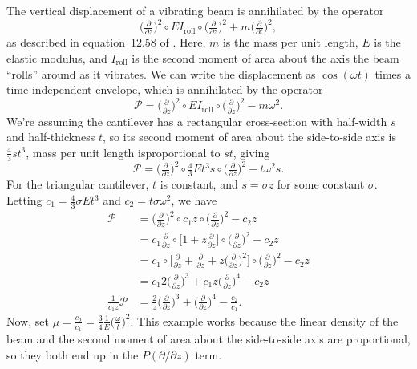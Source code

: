 \documentclass{article}
\theoremstyle{definition}
\theoremstyle{plain}
\newenvironment{verify}{\color{ForestGreen}}{\color{black}}
\begin{document}
\begin{verify}
The vertical displacement of a vibrating beam is annihilated by the operator
\[ \big(\tfrac{\partial}{\partial z}\big)^2 \circ EI_\text{roll} \circ \big(\tfrac{\partial}{\partial z}\big)^2 + m \big(\tfrac{\partial}{\partial t}\big)^2, \]
as described in equation~12.58 of \cite{genta2009vibration}. Here, $m$ is the mass per unit length, $E$ is the elastic modulus, and $I_\text{roll}$ is the second moment of area about the axis the beam ``rolls'' around as it vibrates. We can write the displacement as $\cos(\omega t)$ times a time-independent envelope, which is annihilated by the operator
\[ \mathcal{P} = \big(\tfrac{\partial}{\partial z}\big)^2 \circ EI_\text{roll} \circ \big(\tfrac{\partial}{\partial z}\big)^2 - m\omega^2. \]
We're assuming the cantilever has a rectangular cross-section with half-width $s$ and half-thickness $t$, so its second moment of area about the side-to-side axis is $\tfrac{4}{3}st^3$, mass per unit length isproportional to $st$, giving
\[ \mathcal{P} = \big(\tfrac{\partial}{\partial z}\big)^2 \circ \tfrac{4}{3}Et^3 s \circ \big(\tfrac{\partial}{\partial z}\big)^2 - t\omega^2 s. \]
For the triangular cantilever, $t$ is constant, and $s = \sigma z$ for some constant $\sigma$. Letting $c_1 = \tfrac{4}{3}\sigma Et^3$ and $c_2 = t\sigma\omega^2$, we have
\begin{align*}
\mathcal{P} & = \big(\tfrac{\partial}{\partial z}\big)^2 \circ c_1 z \circ \big(\tfrac{\partial}{\partial z}\big)^2 - c_2 z \\
& = c_1 \tfrac{\partial}{\partial z} \circ \big[ 1 + z \tfrac{\partial}{\partial z} \big] \circ \big(\tfrac{\partial}{\partial z}\big)^2 - c_2 z \\
& = c_1 \circ \big[ \tfrac{\partial}{\partial z} + \tfrac{\partial}{\partial z} + z \big(\tfrac{\partial}{\partial z}\big)^2 \big] \circ \big(\tfrac{\partial}{\partial z}\big)^2 - c_2 z \\
& = c_1 2\big(\tfrac{\partial}{\partial z}\big)^3 + c_1 z \big(\tfrac{\partial}{\partial z}\big)^4 - c_2 z \\
\tfrac{1}{c_1 z} \mathcal{P} & = \tfrac{2}{z} \big(\tfrac{\partial}{\partial z}\big)^3 + \big(\tfrac{\partial}{\partial z}\big)^4 - \tfrac{c_2}{c_1}.
\end{align*}
Now, set $\mu = \tfrac{c_2}{c_1} = \tfrac{3}{4} \tfrac{1}{E} \big(\tfrac{\omega}{t}\big)^2$. This example works because the linear density of the beam and the second moment of area about the side-to-side axis are proportional, so they both end up in the $P(\partial/\partial z)$ term.\par
\end{verify}
\end{document}
